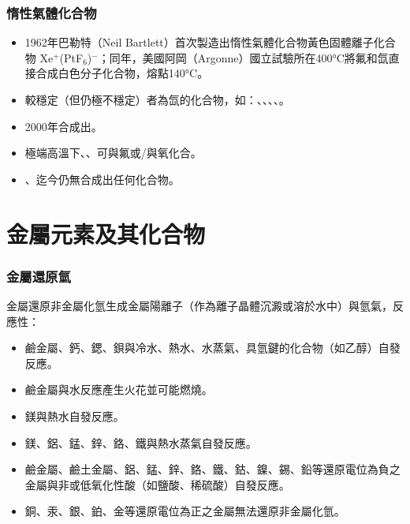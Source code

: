 \documentclass[a4paper,12pt]{report}
\begin{document}
\begin{itemize}
\begin{itemize}
\subsubsection{惰性氣體化合物}
\begin{itemize}
\item 1962年巴勒特（Neil Bartlett）首次製造出惰性氣體化合物黃色固體離子化合物 Xe$^+$(PtF$_6$)$^-$；同年，美國阿岡（Argonne）國立試驗所在400°C將氟和氙直接合成白色分子化合物，熔點140°C。
\item 較穩定（但仍極不穩定）者為氙的化合物，如：、、、、。
\item 2000年合成出。
\item 極端高溫下、、可與氟或/與氧化合。
\item {}、迄今仍無合成出任何化合物。
\end{itemize}


\section{金屬元素及其化合物}
\subsubsection{金屬還原氫}
金屬還原非金屬化氫生成金屬陽離子（作為離子晶體沉澱或溶於水中）與氫氣，反應性：
\begin{itemize}
\item 鹼金屬、鈣、鍶、鋇與冷水、熱水、水蒸氣、具氫鍵的化合物（如乙醇）自發反應。
\item 鹼金屬與水反應產生火花並可能燃燒。
\item 鎂與熱水自發反應。
\item 鎂、鋁、錳、鋅、鉻、鐵與熱水蒸氣自發反應。
\item 鹼金屬、鹼土金屬、鋁、錳、鋅、鉻、鐵、鈷、鎳、錫、鉛等還原電位為負之金屬與非或低氧化性酸（如鹽酸、稀硫酸）自發反應。
\item 銅、汞、銀、鉑、金等還原電位為正之金屬無法還原非金屬化氫。
\end{itemize}

\end{itemize}
\end{itemize}
\end{document}
